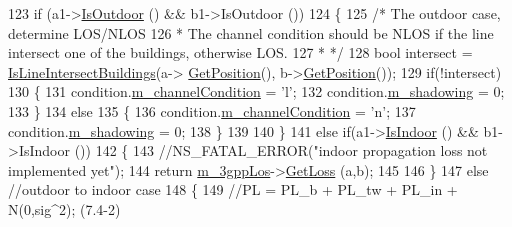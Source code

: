 \begin{DoxyCode}
123                 \textcolor{keywordflow}{if} (a1->\hyperlink{classns3_1_1MobilityBuildingInfo_ae7fba237e7e3eaf40139bec948ec238a}{IsOutdoor} () && b1->IsOutdoor ())
124                 \{
125                         \textcolor{comment}{/* The outdoor case, determine LOS/NLOS}
126 \textcolor{comment}{                         * The channel condition should be NLOS if the line intersect one of the buildings,
       otherwise LOS.}
127 \textcolor{comment}{                         * */}
128                         \textcolor{keywordtype}{bool} intersect = \hyperlink{classns3_1_1MmWave3gppBuildingsPropagationLossModel_a6bda988e9a066c968bb391ef158c7ed0}{IsLineIntersectBuildings}(a->
      \hyperlink{classns3_1_1MobilityModel_aba838f06ec5bbb2d193d94b8c0e4abb4}{GetPosition}(), b->\hyperlink{classns3_1_1MobilityModel_aba838f06ec5bbb2d193d94b8c0e4abb4}{GetPosition}());
129                         \textcolor{keywordflow}{if}(!intersect)
130                         \{
131                                 condition.\hyperlink{structchannelCondition_a1fbbec1a89c5da0961efaca304ade4d1}{m\_channelCondition} = \textcolor{charliteral}{'l'};
132                                 condition.\hyperlink{structchannelCondition_abf42a510bc41e8eb84c96f9b47cc8f47}{m\_shadowing} = 0;
133                         \}
134                         \textcolor{keywordflow}{else}
135                         \{
136                                 condition.\hyperlink{structchannelCondition_a1fbbec1a89c5da0961efaca304ade4d1}{m\_channelCondition} = \textcolor{charliteral}{'n'};
137                                 condition.\hyperlink{structchannelCondition_abf42a510bc41e8eb84c96f9b47cc8f47}{m\_shadowing} = 0;
138                         \}
139 
140                 \}
141                 \textcolor{keywordflow}{else} \textcolor{keywordflow}{if}(a1->\hyperlink{classns3_1_1MobilityBuildingInfo_a2bba20054cc48efcca2d5e0c46f8171c}{IsIndoor} () && b1->IsIndoor ())
142                 \{
143                         \textcolor{comment}{//NS\_FATAL\_ERROR("indoor propagation loss not implemented yet");}
144                         \textcolor{keywordflow}{return}  \hyperlink{classns3_1_1MmWave3gppBuildingsPropagationLossModel_a301f6c6643f00646ce16bd114ad22389}{m\_3gppLos}->\hyperlink{classMmWave3gppPropagationLossModel_ae389c108155d92774975e8a8d0de9c6a}{GetLoss} (a,b);
145 
146                 \}
147                 \textcolor{keywordflow}{else} \textcolor{comment}{//outdoor to indoor case}
148                 \{
149                         \textcolor{comment}{//PL = PL\_b + PL\_tw + PL\_in + N(0,sig^2); (7.4-2)}

\end{DoxyCode}
